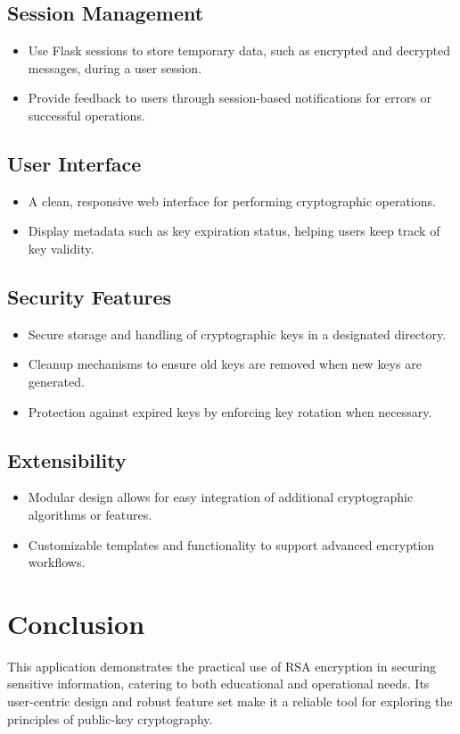 \documentclass[12pt]{article}
\begin{document}
\subsection*{Session Management}
\begin{itemize}
    \item Use Flask sessions to store temporary data, such as encrypted and decrypted messages, during a user session.
    \item Provide feedback to users through session-based notifications for errors or successful operations.
\end{itemize}

\subsection*{User Interface}
\begin{itemize}
    \item A clean, responsive web interface for performing cryptographic operations.
    \item Display metadata such as key expiration status, helping users keep track of key validity.
\end{itemize}

\subsection*{Security Features}
\begin{itemize}
    \item Secure storage and handling of cryptographic keys in a designated directory.
    \item Cleanup mechanisms to ensure old keys are removed when new keys are generated.
    \item Protection against expired keys by enforcing key rotation when necessary.
\end{itemize}

\subsection*{Extensibility}
\begin{itemize}
    \item Modular design allows for easy integration of additional cryptographic algorithms or features.
    \item Customizable templates and functionality to support advanced encryption workflows.
\end{itemize}

\section*{Conclusion}
This application demonstrates the practical use of RSA encryption in securing sensitive information, catering to both educational and operational needs. Its user-centric design and robust feature set make it a reliable tool for exploring the principles of public-key cryptography.
\end{document}
